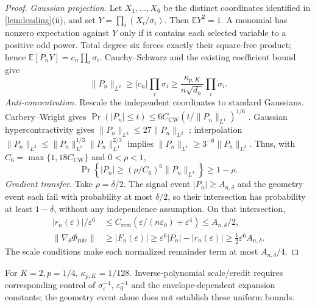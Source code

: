 \begin{proof}
\emph{Gaussian projection.} Let $X_1,\ldots,X_6$ be the distinct coordinates
identified in \cref{lem:leading}(ii), and set $Y=\prod_i(X_i/\sigma_i)$.
Then $\mathbb E Y^2=1$. A monomial has nonzero expectation against $Y$
only if it contains each selected variable to a positive odd power.
Total degree six forces exactly their square-free product; hence
$\mathbb E[P_nY]=c_n\prod_i\sigma_i$. Cauchy--Schwarz and the existing coefficient bound give
\begin{equation}\label{eq:quant-rule-L2}
 \|P_n\|_{L^2}\ge |c_n|\prod_i\sigma_i
 \ge\frac{\kappa_{p,K}}{n\sqrt{d_h}}\prod_i\sigma_i.
\end{equation}
\emph{Anti-concentration.} Rescale the independent coordinates to standard
Gaussians. Carbery--Wright gives
$\Pr(|P_n|\le t)\le6C_{\mathrm{CW}}(t/\|P_n\|_{L^1})^{1/6}$
\citep{carbery2001distributional}. Gaussian hypercontractivity gives
$\|P_n\|_{L^4}\le27\|P_n\|_{L^2}$ \citep{janson1997gaussian}; interpolation
$\|P_n\|_{L^2}\le\|P_n\|_{L^1}^{1/3}\|P_n\|_{L^4}^{2/3}$ implies
$\|P_n\|_{L^1}\ge3^{-6}\|P_n\|_{L^2}$.
Thus, with $C_6=\max\{1,18C_{\mathrm{CW}}\}$ and $0<\rho<1$,
\begin{equation}\label{eq:quant-rule-AC}
 \Pr\!\left\{|P_n|\ge(\rho/C_6)^6\|P_n\|_{L^2}\right\}\ge1-\rho.
\end{equation}
\emph{Gradient transfer.} Take $\rho=\delta/2$. The signal event
$|P_n|\ge A_{n,\delta}$ and the geometry event each fail with probability
at most $\delta/2$, so their intersection has probability at least
$1-\delta$, without any independence assumption. On that intersection,
\begin{align*}
 |r_n(\varepsilon)|/\varepsilon^6
 &\le C_{\mathrm{rem}}(\varepsilon/(n\varepsilon_0)+\varepsilon^4)
 \le A_{n,\delta}/2,\\
 \|\nabla_\theta\Phi_{\mathrm{rule}}\|
 &\ge |F_n(\varepsilon)|\ge\varepsilon^6|P_n|-|r_n(\varepsilon)|
 \ge\tfrac12\varepsilon^6 A_{n,\delta}.
\end{align*}
The scale conditions make each normalized remainder term at most
$A_{n,\delta}/4$.
\end{proof}



For $K=2,p=1/4$, $\kappa_{p,K}=1/128$. Inverse-polynomial scale/credit
requires corresponding control of $\sigma_i^{-1}$, $\varepsilon_0^{-1}$
and the envelope-dependent expansion constants; the geometry event alone
does not establish these uniform bounds.

